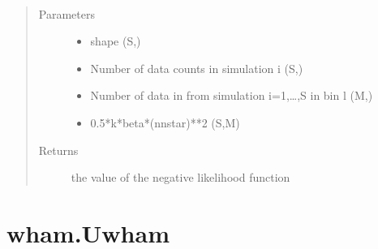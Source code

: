 \documentclass[letterpaper,10pt,english]{sphinxmanual}
\begin{document}
\begin{fulllineitems}
\label{\detokenize{wham:wham.Bwham.Bwham_NLL_eq}}~\begin{quote}\begin{description}
\item[{Parameters}] \leavevmode\begin{itemize}
\item {} 
 \textendash{} shape (S,)

\item {} 
 \textendash{} Number of data counts in simulation i (S,)

\item {} 
 \textendash{} Number of data in from simulation i=1,…,S in bin l (M,)

\item {} 
 \textendash{} 0.5*k*beta*(n\sphinxhyphen{}nstar)**2 (S,M)

\end{itemize}

\item[{Returns}] \leavevmode
the value of the negative likelihood function

\end{description}\end{quote}

\end{fulllineitems}



\section{wham.Uwham}
\label{\detokenize{wham:module-wham.Uwham}}\label{\detokenize{wham:wham-uwham}}
\end{document}
